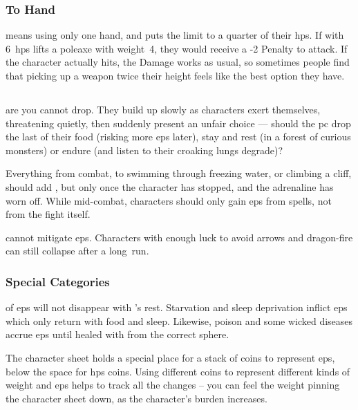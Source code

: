\begin{multicols}{2}
\subsubsection{To Hand}
means using only one hand, and puts the limit to a quarter of their \glspl{hp}.
If  with 6~\glspl{hp} lifts a poleaxe with \gls{weight}~4, they would receive a -2 Penalty to attack.
If the character actually hits, the Damage works as usual, so sometimes people find that picking up a weapon twice their height feels like the best option they have.

\subsection{}
\label{ep}

 are  you cannot drop.
They build up slowly as characters exert themselves, threatening quietly, then suddenly present an unfair choice --- should the \gls{pc} drop the last of their food (risking more \glspl{ep} later), stay and rest (in a forest of curious \glspl{monster}) or endure (and listen to their croaking lungs degrade)?

Everything from combat, to swimming through freezing water, or climbing a cliff, should add , but only once the character has stopped, and the adrenaline has worn off.
While mid-combat, characters should only gain \glspl{ep} from spells, not from the fight itself.

 cannot mitigate \glspl{ep}.
Characters with enough luck to avoid arrows and dragon-fire can still collapse after a long~run.

\subsubsection{Special Categories}
of \glspl{ep} will not disappear with 's rest.
Starvation and sleep deprivation inflict \glspl{ep} which only return with food and sleep.
Likewise, poison and some wicked diseases accrue \glspl{ep} until healed with  from the correct \gls{sphere}.

The character sheet holds a special place for a stack of coins to represent \glspl{ep}, below the space for \glspl{hp} coins.
Using different coins to represent different kinds of \gls{weight} and \glspl{ep} helps to track all the changes -- you can feel the weight pinning the character sheet down, as the character's burden increases.

\end{multicols}

